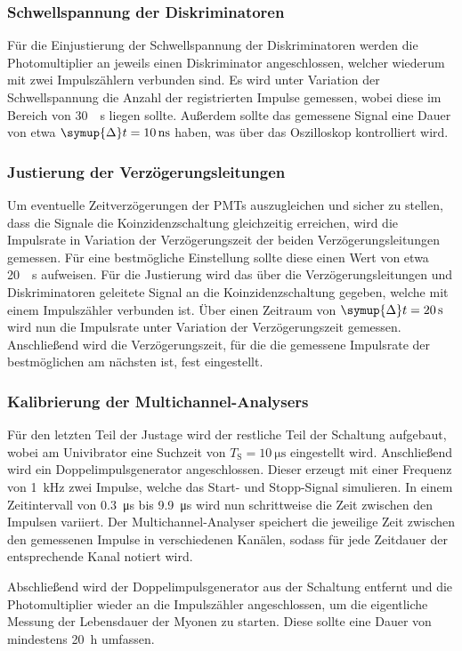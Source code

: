 \subsubsection{Schwellspannung der Diskriminatoren}

Für die Einjustierung der Schwellspannung der Diskriminatoren werden die Photomultiplier an jeweils einen Diskriminator angeschlossen,
welcher wiederum mit zwei Impulszählern verbunden sind.
Es wird unter Variation der Schwellspannung die Anzahl der registrierten Impulse gemessen,
wobei diese im Bereich von \SI[per-mode=reciprocal]{30}{\per\second} liegen sollte.
Außerdem sollte das gemessene Signal eine Dauer von etwa $\symup{\Delta}t = \SI{10}{\nano\second}$ haben,
was über das Oszilloskop kontrolliert wird.

\subsubsection{Justierung der Verzögerungsleitungen}

Um eventuelle Zeitverzögerungen der PMTs auszugleichen und sicher zu stellen,
dass die Signale die Koinzidenzschaltung gleichzeitig erreichen,
wird die Impulsrate in Variation der Verzögerungszeit der beiden Verzögerungsleitungen gemessen.
Für eine bestmögliche Einstellung sollte diese einen Wert von etwa \SI[per-mode=reciprocal]{20}{\per\second} aufweisen.
Für die Justierung wird das über die Verzögerungsleitungen und Diskriminatoren geleitete Signal an die Koinzidenzschaltung gegeben,
welche mit einem Impulszähler verbunden ist.
Über einen Zeitraum von $\symup{\Delta}t = \SI{20}{\second}$ wird nun die Impulsrate unter Variation der Verzögerungszeit gemessen.
Anschließend wird die Verzögerungszeit, 
für die die gemessene Impulsrate der bestmöglichen am nächsten ist,
fest eingestellt.

\subsubsection{Kalibrierung der Multichannel-Analysers}

Für den letzten Teil der Justage wird der restliche Teil der Schaltung aufgebaut,
wobei am Univibrator eine Suchzeit von $T_\text{S} = \SI{10}{\micro\second}$ eingestellt wird.
Anschließend wird ein Doppelimpulsgenerator angeschlossen.
Dieser erzeugt mit einer Frequenz von \SI{1}{\kilo\hertz} zwei Impulse,
welche das Start- und Stopp-Signal simulieren.
In einem Zeitintervall von \SI{0.3}{\micro\second} bis \SI{9.9}{\micro\second} wird nun schrittweise die Zeit zwischen den Impulsen variiert.
Der Multichannel-Analyser speichert die jeweilige Zeit zwischen den gemessenen Impulse in verschiedenen Kanälen,
sodass für jede Zeitdauer der entsprechende Kanal notiert wird.

Abschließend wird der Doppelimpulsgenerator aus der Schaltung entfernt und die Photomultiplier wieder an die Impulszähler angeschlossen,
um die eigentliche Messung der Lebensdauer der Myonen zu starten.
Diese sollte eine Dauer von mindestens \SI{20}{\hour} umfassen.
